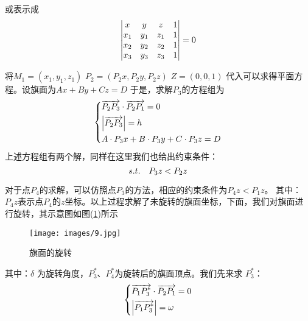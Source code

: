             或表示成
            \begin{equation*}
            \centering
            \begin{vmatrix}
            x&y&z&1\\
            x_{1}&y_{1}&z_{1}&1\\
            x_{2}&y_{2}&z_{2}&1\\
            x_{3}&y_{3}&z_{3}&1
             \end{vmatrix} =0
             \end{equation*}
             \par
             将$M_1=(x_1,y_1,z_1)$ $P_2=(P_2x,P_2y,P_2z)$ $Z=(0,0,1)$ 代入可以求得平面方程。设旗面为$Ax+By+Cz=D$
            于是，求解$P_{3}$的方程组为
            \begin{equation*}
            \centering
            \left\{\begin{lgathered}
            \overrightarrow{P_{2}P_{3}}\cdot\overrightarrow{P_{2}P_{1}}=0\\
            \left|\overrightarrow{P_{2}P_{3}}\right|=h\\
            A\cdot P_{3}x+B\cdot P_{3}y+C\cdot P_{3}z=D
             \end{lgathered} \right.
             \end{equation*}
            上述方程组有两个解，同样在这里我们也给出约束条件：
            \begin{equation*}
            \centering
            s.t.\quad P_{3}z<P_{2}z
             \end{equation*}
             \par
             对于点$P_{4}$的求解，可以仿照点$P_{3}$的方法，相应的约束条件为$P_{4}z<P_{1}z$。
            其中：$P_{4}z$表示点$P_{4}$的$z$坐标。以上过程求解了未旋转的旗面坐标，下面，我们对旗面进行旋转，其示意图如图(\ref{fig:旗面的旋转})所示
            \begin{figure}[H]
            \centering
            \texttt{[image: images/9.jpg]}
            \caption{旗面的旋转}
            \label{fig:旗面的旋转}
            \end{figure}
            \noindent 其中：$\delta$ 为旋转角度，$P_{3}^{*}$、$P_{4}^{*}$为旋转后的旗面顶点。我们先来求 $P_{3}^{*}$：
            \begin{equation*}
            \centering
            \left\{\begin{lgathered}
            \overrightarrow{P_1P_3^*}\cdot \overrightarrow{P_2P_1}=0\\
            \left|\overrightarrow{P_1P_3^*}\right|=\omega
             \end{lgathered} \right.
             \end{equation*}
